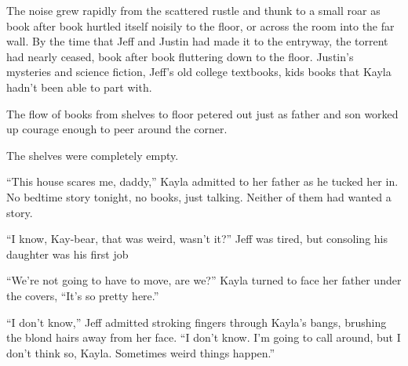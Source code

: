 The noise grew rapidly from the scattered rustle and thunk to a small roar as book after book hurtled itself noisily to the floor, or across the room into the far wall.  By the time that Jeff and Justin had made it to the entryway, the torrent had nearly ceased, book after book fluttering down to the floor.  Justin's mysteries and science fiction, Jeff's old college textbooks, kids books that Kayla hadn't been able to part with.

The flow of books from shelves to floor petered out just as father and son worked up courage enough to peer around the corner.

The shelves were completely empty.

\secdiv

``This house scares me, daddy,'' Kayla admitted to her father as he tucked her in.  No bedtime story tonight, no books, just talking.  Neither of them had wanted a story.

``I know, Kay-bear, that was weird, wasn't it?''  Jeff was tired, but consoling his daughter was his first job

``We're not going to have to move, are we?''  Kayla turned to face her father under the covers, ``It's so pretty here.''

``I don't know,'' Jeff admitted stroking fingers through Kayla's bangs, brushing the blond hairs away from her face.  ``I don't know.  I'm going to call around, but I don't think so, Kayla.  Sometimes weird things happen.''
